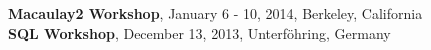 \documentclass[10pt]{article}
\begin{document}
  \textbf{Macaulay2 Workshop}, January 6 - 10, 2014, Berkeley, California \\

  \textbf{SQL Workshop}, December 13, 2013, Unterf\"ohring, Germany\\











  \begin{tabular*}{\textwidth}{c}
  \hline
  \end{tabular*}
\end{document}
